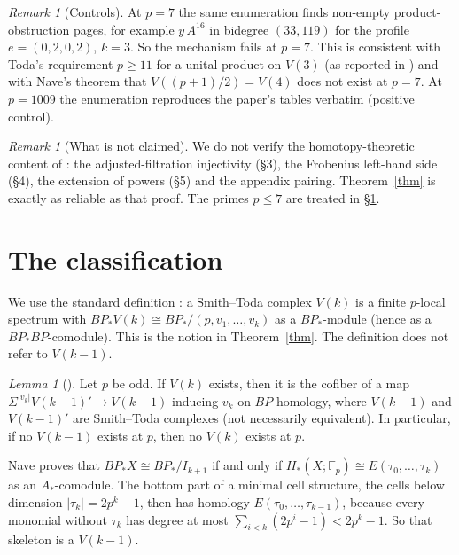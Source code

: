 \documentclass[11pt]{amsart}
\theoremstyle{remark}
\newtheorem{remark}[theorem]{Remark}
\newtheorem{lemma}[theorem]{Lemma}
\begin{document}
\begin{remark}[Controls]
At $p=7$ the same enumeration finds non-empty product-obstruction pages, for example
$y\,A^{16}$ in bidegree $(33,119)$ for the profile $e=(0,2,0,2)$, $k=3$. So the mechanism fails at
$p=7$. This is consistent with Toda's requirement $p\ge11$ for a unital product on $V(3)$ (as reported in
\cite[\S5.6, p.~184]{Rav}) and with Nave's
theorem that $V((p+1)/2)=V(4)$ does not exist at $p=7$. At $p=1009$ the enumeration reproduces the
paper's tables verbatim (positive control).
\end{remark}

\begin{remark}[What is not claimed]
We do not verify the homotopy-theoretic content of \cite{OAI308}: the adjusted-filtration injectivity
(\S3), the Frobenius left-hand side (\S4), the extension of powers (\S5) and the appendix pairing.
Theorem~\ref{thm} is exactly as reliable as that proof. The primes $p\le7$ are treated in \S\ref{sec:class}.
\end{remark}


\section{The classification}\label{sec:class}
We use the standard definition \cite[Definition~1.1]{Nave}: a Smith--Toda complex $V(k)$ is a finite
$p$-local spectrum with $BP_*V(k)\cong BP_*/(p,v_1,\dots,v_k)$ as a $BP_*$-module (hence as a
$BP_*BP$-comodule). This is the notion in Theorem~\ref{thm}. The definition does not refer to $V(k-1)$.

\begin{lemma}[{\cite[Theorem~1.2 and p.~493]{Nave}}]\label{lem:skel}
Let $p$ be odd. If $V(k)$ exists, then it is the cofiber of a map
$\Sigma^{|v_k|}V(k-1)'\to V(k-1)$ inducing $v_k$ on $BP$-homology, where $V(k-1)$ and $V(k-1)'$ are Smith--Toda
complexes (not necessarily equivalent). In particular, if no $V(k-1)$ exists at $p$, then no $V(k)$ exists at $p$.
\end{lemma}
Nave proves that $BP_*X\cong BP_*/I_{k+1}$ if and only if $H_*(X;\mathbb F_p)\cong E(\tau_0,\dots,\tau_k)$ as
an $A_*$-comodule. The bottom part of a minimal cell structure, the cells below dimension $|\tau_k|=2p^k-1$,
then has homology $E(\tau_0,\dots,\tau_{k-1})$, because every monomial without $\tau_k$ has degree at most
$\sum_{i<k}(2p^i-1)<2p^k-1$. So that skeleton is a $V(k-1)$.
\end{document}
